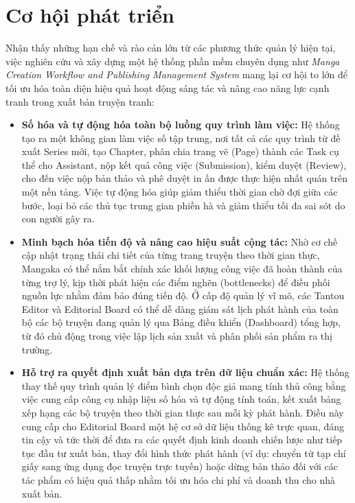 \section{Cơ hội phát triển}
\label{sec:co_hoi_phat_trien}

Nhận thấy những hạn chế và rào cản lớn từ các phương thức quản lý hiện tại, việc nghiên cứu và xây dựng một hệ thống phần mềm chuyên dụng như \textit{Manga Creation Workflow and Publishing Management System} mang lại cơ hội to lớn để tối ưu hóa toàn diện hiệu quả hoạt động sáng tác và nâng cao năng lực cạnh tranh trong xuất bản truyện tranh:

\begin{itemize}
    \item \textbf{Số hóa và tự động hóa toàn bộ luồng quy trình làm việc:} Hệ thống tạo ra một không gian làm việc số tập trung, nơi tất cả các quy trình từ đề xuất Series mới, tạo Chapter, phân chia trang vẽ (Page) thành các Task cụ thể cho Assistant, nộp kết quả công việc (Submission), kiểm duyệt (Review), cho đến việc nộp bản thảo và phê duyệt in ấn được thực hiện nhất quán trên một nền tảng. Việc tự động hóa giúp giảm thiểu thời gian chờ đợi giữa các bước, loại bỏ các thủ tục trung gian phiền hà và giảm thiểu tối đa sai sót do con người gây ra.
    \item \textbf{Minh bạch hóa tiến độ và nâng cao hiệu suất cộng tác:} Nhờ cơ chế cập nhật trạng thái chi tiết của từng trang truyện theo thời gian thực, Mangaka có thể nắm bắt chính xác khối lượng công việc đã hoàn thành của từng trợ lý, kịp thời phát hiện các điểm nghẽn (bottlenecks) để điều phối nguồn lực nhằm đảm bảo đúng tiến độ. Ở cấp độ quản lý vĩ mô, các Tantou Editor và Editorial Board có thể dễ dàng giám sát lịch phát hành của toàn bộ các bộ truyện đang quản lý qua Bảng điều khiển (Dashboard) tổng hợp, từ đó chủ động trong việc lập lịch sản xuất và phân phối sản phẩm ra thị trường.
    \item \textbf{Hỗ trợ ra quyết định xuất bản dựa trên dữ liệu chuẩn xác:} Hệ thống thay thế quy trình quản lý điểm bình chọn độc giả mang tính thủ công bằng việc cung cấp công cụ nhập liệu số hóa và tự động tính toán, kết xuất bảng xếp hạng các bộ truyện theo thời gian thực sau mỗi kỳ phát hành. Điều này cung cấp cho Editorial Board một hệ cơ sở dữ liệu thống kê trực quan, đáng tin cậy và tức thời để đưa ra các quyết định kinh doanh chiến lược như tiếp tục đầu tư xuất bản, thay đổi hình thức phát hành (ví dụ: chuyển từ tạp chí giấy sang ứng dụng đọc truyện trực tuyến) hoặc dừng bản thảo đối với các tác phẩm có hiệu quả thấp nhằm tối ưu hóa chi phí và doanh thu cho nhà xuất bản.
\end{itemize}

